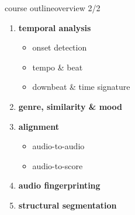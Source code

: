         \begin{frame}{course outline}{overview 2/2}
            \begin{enumerate}
            \setcounter{enumi}{\value{iDistance}}
                \item	\textbf{temporal analysis}
                        \begin{itemize}
                            \item	onset detection
                            \item	tempo \& beat
                            \item	downbeat \& time signature
                        \end{itemize}
                \smallskip
                \item<2->	\textbf{genre, similarity \& mood}
                \smallskip
                \item<3->	\textbf{alignment}
                        \begin{itemize}
                            \item	audio-to-audio
                            \item	audio-to-score
                        \end{itemize}
                \smallskip
                \item<4->	\textbf{audio fingerprinting}
                \smallskip
                \item<5->	\textbf{structural segmentation}
            \end{enumerate}
        \end{frame}


